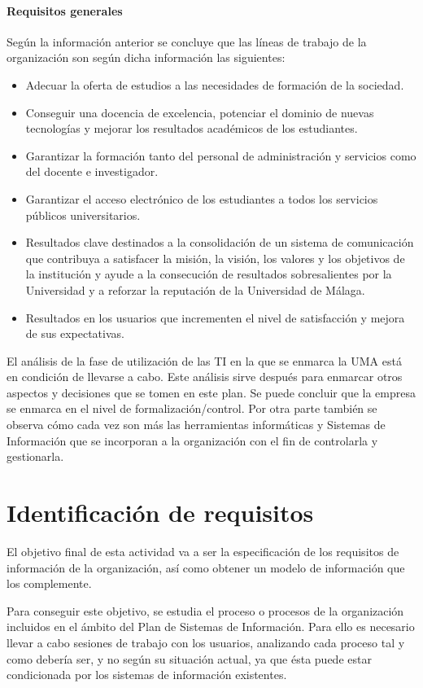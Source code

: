 \documentclass[11pt,a4paper,spanish,twoside]{report}
\begin{document}
\subsubsection{Requisitos generales}
Según la información anterior se concluye que las líneas de trabajo de
la organización son según dicha información las siguientes: 
\begin{itemize}
\item Adecuar la oferta de estudios a las necesidades de formación de la
  sociedad.
\item Conseguir una docencia de excelencia, potenciar el dominio de nuevas
  tecnologías y mejorar los resultados académicos de los estudiantes.
\item Garantizar la formación tanto del personal de administración y servicios
  como del docente e investigador.
\item Garantizar el acceso electrónico de los estudiantes a todos los servicios
  públicos universitarios.
\item Resultados clave destinados a la consolidación de un sistema de
  comunicación que contribuya a satisfacer la misión, la visión, los valores
  y los objetivos de la institución y ayude a la consecución de resultados
  sobresalientes por la Universidad y a reforzar la reputación de la
  Universidad de Málaga.
\item Resultados en los usuarios que incrementen el nivel de satisfacción y
  mejora de sus expectativas.
\end{itemize}
        
El análisis de la fase de utilización de las TI en la que se enmarca la 
UMA está en condición de llevarse a cabo. Este análisis sirve después
para enmarcar otros aspectos y decisiones que se tomen en este plan. Se puede
concluir que la empresa se enmarca en el nivel de formalización/control. Por
otra parte también se observa cómo cada vez son más las herramientas
informáticas y Sistemas de Información que se incorporan a la organización
con el fin de controlarla y gestionarla. 

\chapter{Identificación de requisitos}
El objetivo final de esta actividad va a ser la especificación de los
requisitos de información de la organización, así como obtener un modelo de
información que los complemente.

Para conseguir este objetivo, se estudia el proceso o procesos de la
organización incluidos en el ámbito del Plan de Sistemas de Información. Para
ello es necesario llevar a cabo sesiones de trabajo con los usuarios,
analizando cada proceso tal y como debería ser, y no según su situación
actual, ya que ésta puede estar condicionada por los sistemas de información
existentes. 
\end{document}
